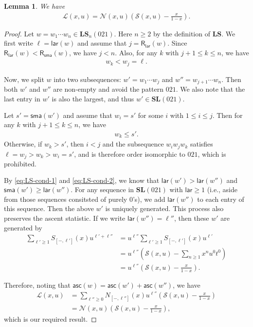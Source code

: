 \documentclass[reqno]{amsart}
\numberwithin{equation}{section}
\theoremstyle{plain}
\newtheorem{lemma}[theorem]{Lemma}
\theoremstyle{definition}
\theoremstyle{named}
\newcommand{\bSL}{\mathbf{SL}}
\newcommand{\bLS}{\mathbf{LS}}
\newcommand{\asc}{\mathsf{asc}}
\newcommand{\lar}{\mathsf{lar}}
\newcommand{\sma}{\mathsf{sma}}
\newcommand{\RLAR}{\mathsf{R}_{\mathsf{lar}}}
\newcommand{\RSMA}{\mathsf{R}_{\mathsf{sma}}}
\newcommand{\cN}{\mathcal{N}}
\newcommand{\cSL}{\mathcal{S}}
\newcommand{\cLS}{\mathcal{L}}
\newcommand{\coSL}{S}
\newcommand{\coN}{N}
\begin{document}
\begin{lemma}\label{le:LS-func-eqn}
	We have
	\begin{align}\label{eq:LS-func-eqn}
		\cLS(x,u)=\cN(x,u)\left(\cSL(x,u)-\frac{x}{1-x}\right).
	\end{align}
\end{lemma}

\begin{proof}
	Let $w=w_1\cdots w_n\in \bLS_n(021)$. Here $n\ge 2$ by the definition of $\bLS$. We first write $\ell=\lar(w)$ and assume that $j=\RLAR(w)$. Since $\RLAR(w)<\RSMA(w)$, we have $j<n$. Also, for any $k$ with $j+1\le k\le n$, we have
	\begin{align}\label{eq:LS-cond-1}
		w_k<w_j=\ell.
	\end{align}
	
	Now, we split $w$ into two subsequences: $w'=w_1\cdots w_j$ and $w''=w_{j+1}\cdots w_n$. Then both $w'$ and $w''$ are non-empty and avoid the pattern $021$. We also note that the last entry in $w'$ is also the largest, and thus $w'\in\bSL(021)$.
	
	Let $s'=\sma(w')$ and assume that $w_i=s'$ for some $i$ with $1\le i\le j$. Then for any $k$ with $j+1\le k\le n$, we have
	\begin{align}\label{eq:LS-cond-2}
		w_k\le s'.
	\end{align}
	Otherwise, if $w_k>s'$, then $i<j$ and the subsequence $w_iw_jw_k$ satisfies $\ell=w_j>w_k>w_i=s'$, and is therefore order isomorphic to $021$, which is prohibited.
	
	By \eqref{eq:LS-cond-1} and \eqref{eq:LS-cond-2}, we know that $\lar(w')>\lar(w'')$ and $\sma(w')\ge \lar(w'')$. For any sequence in $\bSL(021)$ with $\lar\ge 1$ (i.e., aside from those sequences consitsted of purely $0$'s), we add $\lar(w'')$ to each entry of this sequence. Then the above $w'$ is uniquely generated. This process also preserves the ascent statistic. If we write $\lar(w'')=\ell''$, then these $w'$ are generated by
	\begin{align*}
		\sum_{\ell'\ge 1}\coSL_{[-,\ell']}(x) u^{\ell'+\ell''}&=u^{\ell''}\sum_{\ell'\ge 1}\coSL_{[-,\ell']}(x) u^{\ell'}\\
		&=u^{\ell''}\left(\cSL(x,u)-\sum_{n\ge 1}x^nu^0t^0\right)\\
		&=u^{\ell''}\left(\cSL(x,u)-\frac{x}{1-x}\right).
	\end{align*}
	
	Therefore, noting that $\asc(w)=\asc(w')+\asc(w'')$, we have
	\begin{align*}
		\cLS(x,u)&=\sum_{\ell''\ge 0}\coN_{[-,\ell'']}(x)u^{\ell''}\left(\cSL(x,u)-\frac{x}{1-x}\right)\\
		&=\cN(x,u)\left(\cSL(x,u)-\frac{x}{1-x}\right),
	\end{align*}
	which is our required result.
\end{proof}
\end{document}
